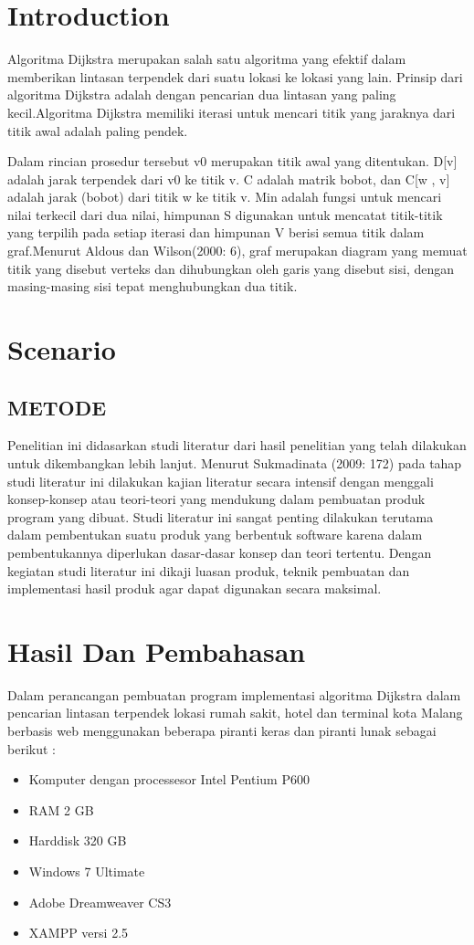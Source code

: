 \documentclass[conference]{IEEEtran}
\begin{document}
\section{Introduction}
Algoritma Dijkstra merupakan salah satu algoritma yang efektif dalam memberikan
lintasan terpendek dari suatu lokasi ke lokasi yang lain. Prinsip dari algoritma Dijkstra adalah
dengan pencarian dua lintasan yang paling kecil.Algoritma Dijkstra memiliki iterasi untuk
mencari titik yang jaraknya dari titik awal adalah paling pendek.

Dalam rincian prosedur tersebut v0 merupakan titik awal yang ditentukan. D[v] adalah
jarak terpendek dari v0 ke titik v. C adalah matrik bobot, dan C[w , v] adalah jarak (bobot) dari
titik w ke titik v. Min adalah fungsi untuk mencari nilai terkecil dari dua nilai, himpunan S
digunakan untuk mencatat titik-titik yang terpilih pada setiap iterasi dan himpunan V berisi
semua titik dalam graf.Menurut Aldous dan Wilson(2000: 6), graf merupakan diagram yang
memuat titik yang disebut verteks dan dihubungkan oleh garis yang disebut sisi, dengan
masing-masing sisi tepat menghubungkan dua titik. 

\section{Scenario}
\subsection{METODE}
Penelitian ini didasarkan studi literatur dari hasil penelitian yang telah dilakukan
untuk dikembangkan lebih lanjut. Menurut Sukmadinata (2009: 172) pada tahap studi literatur
ini dilakukan kajian literatur secara intensif dengan menggali konsep-konsep atau teori-teori
yang mendukung dalam pembuatan produk program yang dibuat. Studi literatur ini sangat
penting dilakukan terutama dalam pembentukan suatu produk yang berbentuk software karena
dalam pembentukannya diperlukan dasar-dasar konsep dan teori tertentu. Dengan kegiatan
studi literatur ini dikaji luasan produk, teknik pembuatan dan implementasi hasil produk agar
dapat digunakan secara maksimal. 

\section{Hasil Dan Pembahasan}
Dalam perancangan pembuatan program implementasi algoritma Dijkstra dalam
pencarian lintasan terpendek lokasi rumah sakit, hotel dan terminal kota Malang berbasis web
menggunakan beberapa piranti keras dan piranti lunak sebagai berikut :
\begin{itemize}
    \item Komputer dengan processesor Intel Pentium P600
    \item RAM 2 GB
    \item Harddisk 320 GB
    \item Windows 7 Ultimate
    \item Adobe Dreamweaver CS3
    \item XAMPP versi 2.5
  \end{itemize}
\end{document}
